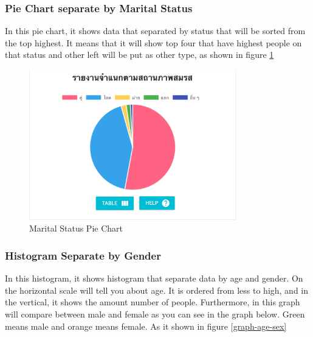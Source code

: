 	    \subsubsection{Pie Chart separate by Marital Status}
            In this pie chart, it shows data that separated by status that will be sorted from the top highest. It means that it will show top four that have highest people on that status and other left will be put as other type, as shown in figure \ref{pie-graph-status}
	
        	\FloatBarrier
            	\begin{figure}[h!]
                    \centering
                		\includegraphics[width=9cm]{images/chapter-05/pie-graph-status.png}
                		\caption{Marital Status Pie Chart}
                		\label{pie-graph-status}
                \end{figure}
        	\FloatBarrier
	
	    \subsubsection{Histogram Separate by Gender}
            In this histogram, it shows histogram that separate data by age and gender. On the horizontal scale will tell you about age. It is ordered from less to high, and in the vertical, it shows the amount number of people. Furthermore, in this graph will compare between male and female as you can see in the graph below. Green means male and orange means female. As it shown in figure \ref{graph-age-sex}
              
